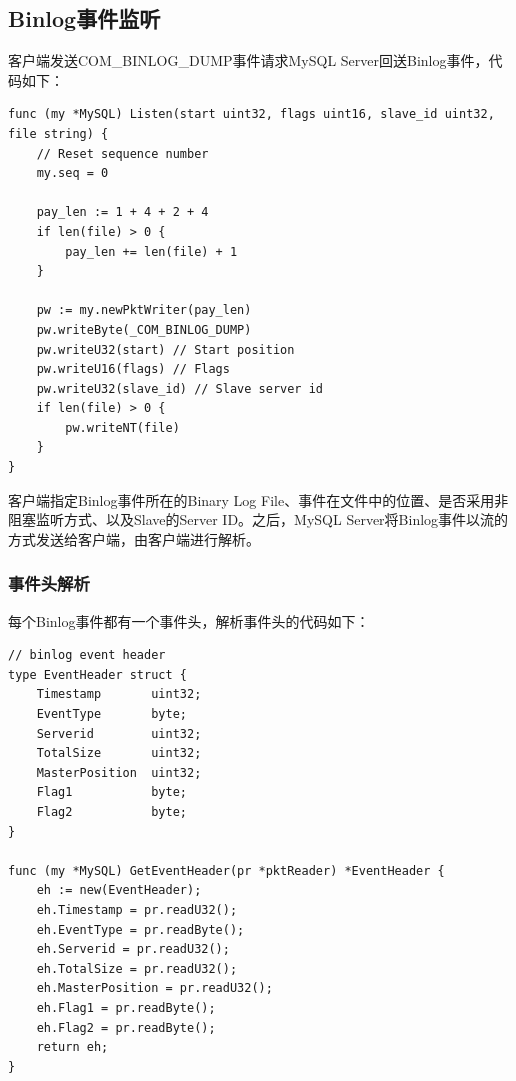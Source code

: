 \documentclass[a4paper, titlepage, 10pt, bookmark]{article}
\begin{document}
\subsection{Binlog事件监听}
客户端发送COM\_BINLOG\_DUMP事件请求MySQL Server回送Binlog事件，代码如下：
\begin{spacing}{1.0}
\begin{lstlisting}
func (my *MySQL) Listen(start uint32, flags uint16, slave_id uint32, file string) {
    // Reset sequence number
    my.seq = 0

    pay_len := 1 + 4 + 2 + 4
    if len(file) > 0 {
        pay_len += len(file) + 1
    }

    pw := my.newPktWriter(pay_len)
    pw.writeByte(_COM_BINLOG_DUMP)
    pw.writeU32(start) // Start position
    pw.writeU16(flags) // Flags
    pw.writeU32(slave_id) // Slave server id
    if len(file) > 0 {
        pw.writeNT(file)
    }
}
\end{lstlisting}
\end{spacing}

客户端指定Binlog事件所在的Binary Log File、事件在文件中的位置、是否采用非阻塞监听方式、以及Slave的Server ID。之后，MySQL Server将Binlog事件以流的方式发送给客户端，由客户端进行解析。

\subsubsection{事件头解析}
每个Binlog事件都有一个事件头，解析事件头的代码如下：
\begin{spacing}{1.0}
\begin{lstlisting}
// binlog event header
type EventHeader struct {
    Timestamp       uint32;
    EventType       byte;
    Serverid        uint32; 
    TotalSize       uint32;
    MasterPosition  uint32;
    Flag1           byte;
    Flag2           byte;
}

func (my *MySQL) GetEventHeader(pr *pktReader) *EventHeader {
    eh := new(EventHeader);
    eh.Timestamp = pr.readU32();
    eh.EventType = pr.readByte();
    eh.Serverid = pr.readU32();
    eh.TotalSize = pr.readU32();
    eh.MasterPosition = pr.readU32();
    eh.Flag1 = pr.readByte();
    eh.Flag2 = pr.readByte();
    return eh;
}
\end{lstlisting}
\end{spacing}
\end{document}
